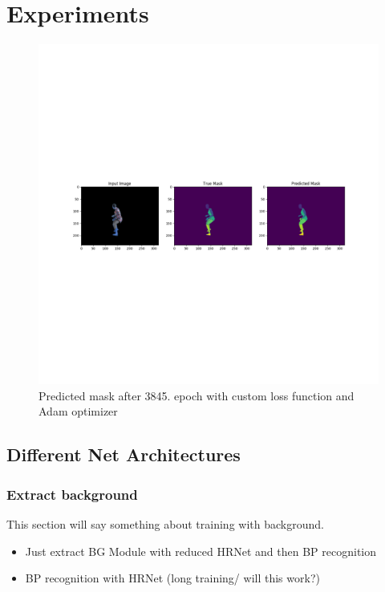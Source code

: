 

\chapter{Experiments} %

\label{Experiments} %

\begin{figure}[H]
    \centering
    \includegraphics[width=\textwidth,height=\textheight,keepaspectratio]{img/adam_prediction_3845_train.png}
    \decoRule
    \caption[Predicted Mask]{Predicted mask after 3845. epoch with custom loss function and Adam optimizer}
    \label{fig:adam-prediction}
\end{figure}


\section{Different Net Architectures}

\subsection{Extract background }
This section will say something about training with background.
\begin{itemize}
    \item Just extract BG Module with reduced HRNet and then BP recognition
    \item BP recognition with HRNet (long training/ will this work?)
\end{itemize}


